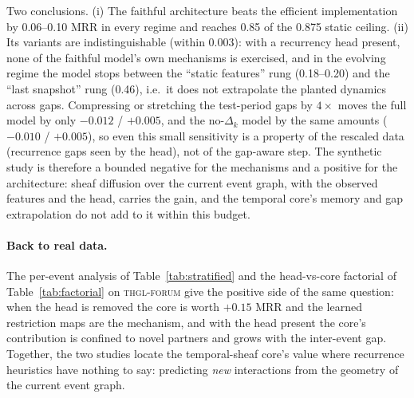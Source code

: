 Two conclusions. (i) The faithful architecture beats the efficient
implementation by 0.06--0.10 MRR in every regime and reaches 0.85 of the
0.875 static ceiling. (ii) Its variants are indistinguishable (within
0.003): with a recurrency head present, none of the faithful model's own
mechanisms is exercised, and in the evolving regime the model stops between
the ``static features'' rung (0.18--0.20) and the ``last snapshot'' rung
(0.46), i.e.\ it does not extrapolate the planted dynamics across gaps.
Compressing or stretching the test-period gaps by $4\times$ moves the full
model by only $-0.012$ / $+0.005$, and the no-$\Delta_k$ model by the same
amounts ($-0.010$ / $+0.005$), so even this small sensitivity is a property
of the rescaled data (recurrence gaps seen by the head), not of the
gap-aware step. The synthetic study is therefore a
bounded negative for the mechanisms and a positive for the architecture:
sheaf diffusion over the current event graph, with the observed features and
the head, carries the gain, and the temporal core's memory and gap
extrapolation do not add to it within this budget.

\paragraph{Back to real data.}
The per-event analysis of Table~\ref{tab:stratified} and the head-vs-core
factorial of Table~\ref{tab:factorial} on \textsc{thgl-forum} give the
positive side of the same question: when the head is removed the core is
worth $+0.15$ MRR and the learned restriction maps are the mechanism, and
with the head present the core's contribution is confined to novel partners
and grows with the inter-event gap. Together, the two studies locate the
temporal-sheaf core's value where recurrence heuristics have nothing to
say: predicting \emph{new} interactions from the geometry of the current
event graph.
